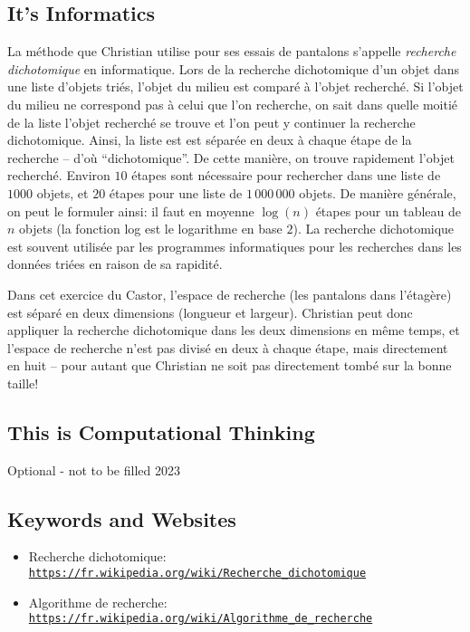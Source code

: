 \documentclass[a4paper,11pt]{report}
\newcommand{\BrochureUrlText}[1]{\texttt{#1}}
\begin{document}
\subsection*{It’s Informatics}

La méthode que Christian utilise pour ses essais de pantalons s’appelle \emph{recherche dichotomique} en informatique. Lors de la recherche dichotomique d’un objet dans une liste d’objets triés, l’objet du milieu est comparé à l’objet recherché. Si l’objet du milieu ne correspond pas à celui que l’on recherche, on sait dans quelle moitié de la liste l’objet recherché se trouve et l’on peut y continuer la recherche dichotomique. Ainsi, la liste est est séparée en deux à chaque étape de la recherche – d’où “dichotomique”. De cette manière, on trouve rapidement l’objet recherché. Environ $10$ étapes sont nécessaire pour rechercher dans une liste de $1000$ objets, et $20$ étapes pour une liste de ${1\,000\,000}$ objets. De manière générale, on peut le formuler ainsi: il faut en moyenne ${\log(n)}$ étapes pour un tableau de ${n}$ objets (la fonction log est le logarithme en base $2$). La recherche dichotomique est souvent utilisée par les programmes informatiques pour les recherches dans les données triées en raison de sa rapidité.

Dans cet exercice du Castor, l’espace de recherche (les pantalons dans l’étagère) est séparé en deux dimensions (longueur et largeur). Christian peut donc appliquer la recherche dichotomique dans les deux dimensions en même temps, et l’espace de recherche n’est pas divisé en deux à chaque étape, mais directement en huit – pour autant que Christian ne soit pas directement tombé sur la bonne taille!


\subsection*{This is Computational Thinking}

Optional - not to be filled 2023

{\raggedright

\subsection*{Keywords and Websites}

\begin{itemize}
  \item Recherche dichotomique: \href{https://fr.wikipedia.org/wiki/Recherche_dichotomique}{\BrochureUrlText{https://fr.wikipedia.org/wiki/Recherche\_dichotomique}}
  \item Algorithme de recherche: \href{https://fr.wikipedia.org/wiki/Algorithme_de_recherche}{\BrochureUrlText{https://fr.wikipedia.org/wiki/Algorithme\_de\_recherche}}
\end{itemize}


}
\end{document}
